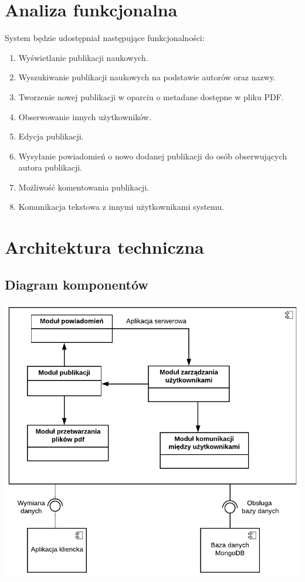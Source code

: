 \documentclass[8pt]{article}
\begin{document}
	\section {Analiza funkcjonalna}	
	\hspace{10pt} 	System będzie udostępniał następujące funkcjonalności:		\begin{enumerate}
		\item Wyświetlanie publikacji naukowych.
		\item Wyszukiwanie publikacji naukowych na podstawie autorów oraz nazwy.
		\item Tworzenie nowej publikacji w oparciu o metadane dostępne w pliku PDF.
		\item Obserwowanie innych użytkowników.
		\item Edycja publikacji.
		\item Wysyłanie powiadomień o nowo dodanej publikacji do osób obserwujących autora publikacji.
		\item Możliwość komentowania publikacji.
		\item Komunikacja tekstowa z innymi użytkownikami systemu.
				
	\end{enumerate}
	\section {Architektura techniczna}	
	\subsection{Diagram komponentów}
	\includegraphics[scale=1.191]{Diagram_komponentow_inz.pdf}
\end{document}
